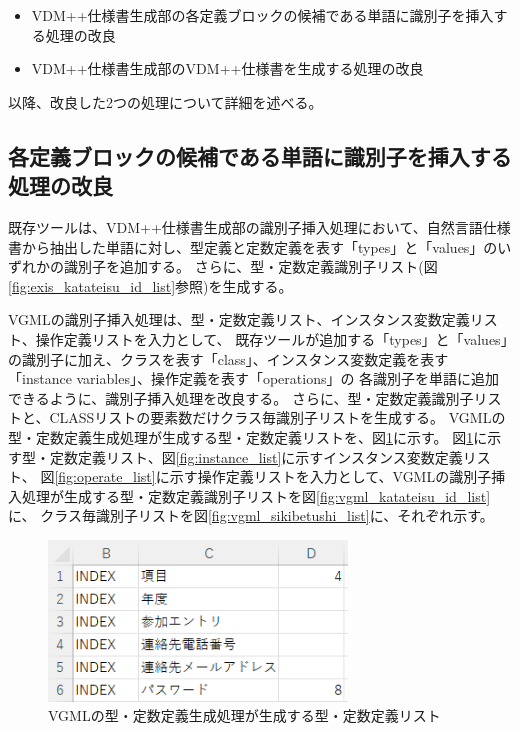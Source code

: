 \begin{itemize}
    \item VDM++仕様書生成部の各定義ブロックの候補である単語に識別子を挿入する処理の改良
    \item VDM++仕様書生成部のVDM++仕様書を生成する処理の改良
\end{itemize}

以降、改良した2つの処理について詳細を述べる。

\subsection{各定義ブロックの候補である単語に識別子を挿入する処理の改良}
既存ツールは、VDM++仕様書生成部の識別子挿入処理において、自然言語仕様書から抽出した単語に対し、型定義と定数定義を表す「types」と「values」のいずれかの識別子を追加する。
さらに、型・定数定義識別子リスト(図\ref{fig:exis_katateisu_id_list}参照)を生成する。

VGMLの識別子挿入処理は、型・定数定義リスト、インスタンス変数定義リスト、操作定義リストを入力として、
既存ツールが追加する「types」と「values」の識別子に加え、クラスを表す「class」、インスタンス変数定義を表す「instance variables」、操作定義を表す「operations」の
各識別子を単語に追加できるように、識別子挿入処理を改良する。
さらに、型・定数定義識別子リストと、CLASSリストの要素数だけクラス毎識別子リストを生成する。
VGMLの型・定数定義生成処理が生成する型・定数定義リストを、図\ref{fig:vgml_katateisu_list}に示す。
図\ref{fig:vgml_katateisu_list}に示す型・定数定義リスト、図\ref{fig:instance_list}に示すインスタンス変数定義リスト、
図\ref{fig:operate_list}に示す操作定義リストを入力として、VGMLの識別子挿入処理が生成する型・定数定義識別子リストを図\ref{fig:vgml_katateisu_id_list}に、
クラス毎識別子リストを図\ref{fig:vgml_sikibetushi_list}に、それぞれ示す。

\begin{figure}[t]
    \begin{center}
        \includegraphics[width=300]{image/vgml_katateisu_list.png}
        \caption{VGMLの型・定数定義生成処理が生成する型・定数定義リスト}
        \label{fig:vgml_katateisu_list}
    \end{center}
\end{figure}

